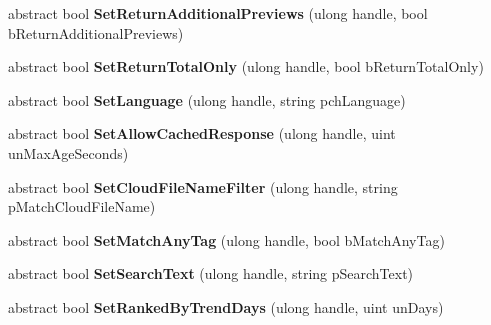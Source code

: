 \begin{DoxyCompactItemize}
\item 
\hypertarget{classValve_1_1Steamworks_1_1ISteamUGC_ae71dc26b8d33184dbf03ec8d81395284}{}abstract bool {\bfseries Set\+Return\+Additional\+Previews} (ulong handle, bool b\+Return\+Additional\+Previews)\label{classValve_1_1Steamworks_1_1ISteamUGC_ae71dc26b8d33184dbf03ec8d81395284}

\item 
\hypertarget{classValve_1_1Steamworks_1_1ISteamUGC_a124b3a5013445210006d0393b92f353e}{}abstract bool {\bfseries Set\+Return\+Total\+Only} (ulong handle, bool b\+Return\+Total\+Only)\label{classValve_1_1Steamworks_1_1ISteamUGC_a124b3a5013445210006d0393b92f353e}

\item 
\hypertarget{classValve_1_1Steamworks_1_1ISteamUGC_a6048597323ee9d5848fe4a2676599dc8}{}abstract bool {\bfseries Set\+Language} (ulong handle, string pch\+Language)\label{classValve_1_1Steamworks_1_1ISteamUGC_a6048597323ee9d5848fe4a2676599dc8}

\item 
\hypertarget{classValve_1_1Steamworks_1_1ISteamUGC_ae955eb13c7bc6c6c9037f50e26a80bb8}{}abstract bool {\bfseries Set\+Allow\+Cached\+Response} (ulong handle, uint un\+Max\+Age\+Seconds)\label{classValve_1_1Steamworks_1_1ISteamUGC_ae955eb13c7bc6c6c9037f50e26a80bb8}

\item 
\hypertarget{classValve_1_1Steamworks_1_1ISteamUGC_a5e25a55ffd5b5a127ed51ea32b324bd3}{}abstract bool {\bfseries Set\+Cloud\+File\+Name\+Filter} (ulong handle, string p\+Match\+Cloud\+File\+Name)\label{classValve_1_1Steamworks_1_1ISteamUGC_a5e25a55ffd5b5a127ed51ea32b324bd3}

\item 
\hypertarget{classValve_1_1Steamworks_1_1ISteamUGC_a351a6ca6d3018e806d0d794416b40046}{}abstract bool {\bfseries Set\+Match\+Any\+Tag} (ulong handle, bool b\+Match\+Any\+Tag)\label{classValve_1_1Steamworks_1_1ISteamUGC_a351a6ca6d3018e806d0d794416b40046}

\item 
\hypertarget{classValve_1_1Steamworks_1_1ISteamUGC_ae37b4601c179542fec006df348416524}{}abstract bool {\bfseries Set\+Search\+Text} (ulong handle, string p\+Search\+Text)\label{classValve_1_1Steamworks_1_1ISteamUGC_ae37b4601c179542fec006df348416524}

\item 
\hypertarget{classValve_1_1Steamworks_1_1ISteamUGC_abe56fcce02e5d2f2ebeed829ffcc777c}{}abstract bool {\bfseries Set\+Ranked\+By\+Trend\+Days} (ulong handle, uint un\+Days)\label{classValve_1_1Steamworks_1_1ISteamUGC_abe56fcce02e5d2f2ebeed829ffcc777c}


\end{DoxyCompactItemize}
